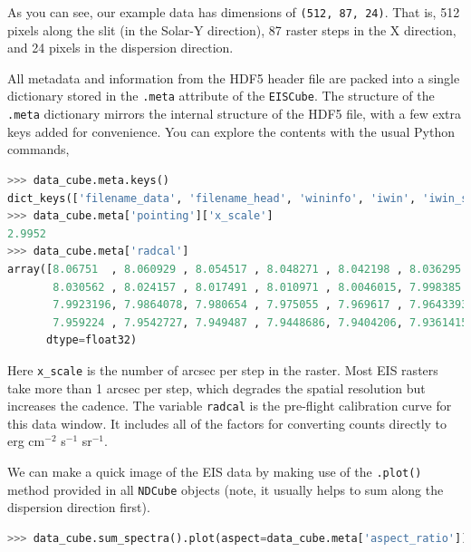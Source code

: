 As you can see, our example data has dimensions of \verb+(512, 87, 24)+. That is, 512 pixels along the slit (in the Solar-Y direction), 87 raster steps in the X direction, and 24 pixels in the dispersion direction.

All metadata and information from the HDF5 header file are packed into a single dictionary stored in the \verb+.meta+ attribute of the \verb+EISCube+. The structure of the \verb+.meta+ dictionary mirrors the internal structure of the HDF5 file, with a few extra keys added for convenience. You can explore the contents with the usual Python commands,

\begin{lstlisting}[language=Python]
>>> data_cube.meta.keys()
dict_keys(['filename_data', 'filename_head', 'wininfo', 'iwin', 'iwin_str', 'index', 'pointing', 'wave', 'radcal', 'slit_width', 'slit_width_units', 'ccd_offset', 'wave_corr', 'wave_corr_t', 'wave_corr_tilt', 'date_obs', 'date_obs_format', 'duration', 'duration_units', 'aspect_ratio', 'notes'])
>>> data_cube.meta['pointing']['x_scale']
2.9952
>>> data_cube.meta['radcal']
array([8.06751  , 8.060929 , 8.054517 , 8.048271 , 8.042198 , 8.036295 ,
       8.030562 , 8.024157 , 8.017491 , 8.010971 , 8.0046015, 7.998385 ,
       7.9923196, 7.9864078, 7.980654 , 7.975055 , 7.969617 , 7.9643393,
       7.959224 , 7.9542727, 7.949487 , 7.9448686, 7.9404206, 7.9361415],
      dtype=float32)
\end{lstlisting}

Here \verb+x_scale+ is the number of arcsec per step in the raster. Most EIS rasters take more than
1 arcsec per step, which degrades the spatial resolution but increases the cadence. The variable
\verb+radcal+ is the pre-flight calibration curve for this data window. It includes all of the
factors for converting counts directly to erg cm$^{-2}$ s$^{-1}$ sr$^{-1}$.

We can make a quick image of the EIS data by making use of the \verb+.plot()+ method provided in all \verb+NDCube+ objects (note, it usually helps to sum along the dispersion direction first).

\begin{lstlisting}[language=Python]
>>> data_cube.sum_spectra().plot(aspect=data_cube.meta['aspect_ratio'])
\end{lstlisting}

